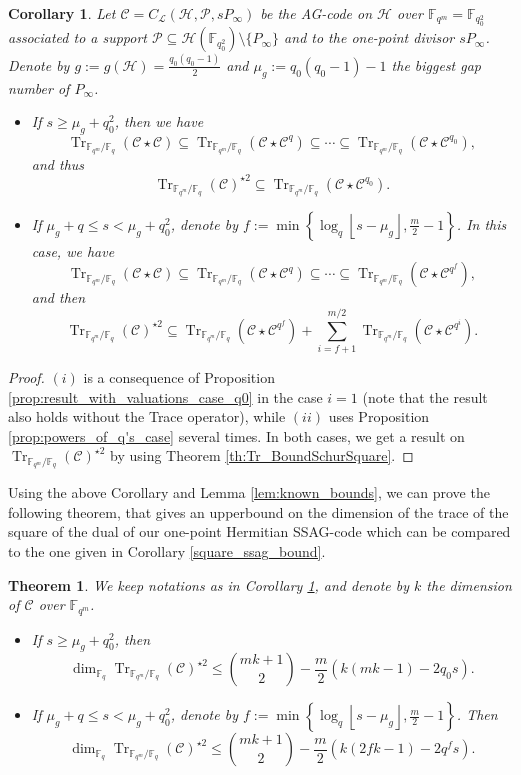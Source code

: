 \documentclass[a4paper]{article}
\newtheorem{coro1}{Corollary}
\newtheorem{thm}{Theorem}
\newcommand{\calP}{\mathcal{P}}
\newcommand{\calH}{\mathcal{H}}
\newcommand{\calL}{\mathcal{L}}
\newcommand{\calC}{\mathcal{C}}
\newcommand{\fqm}{\mathbb{F}_{q^m}}
\newcommand{\fq}{\mathbb{F}_{q}}
\newcommand{\F}{\mathbb{F}}
\newcommand{\Tr}[1]{\operatorname{Tr}_{\mathbb{F}_{q^m}/\fq}\left(#1\right)}
\newcommand{\Floor}[1]{\left\lfloor #1 \right\rfloor}
\begin{document}
\begin{coro1} \label{coro:_inclusion_code_SSAG_case}
Let $\calC = C_{\calL}(\calH,\calP,sP_{\infty})$ be the AG-code on $\calH$ over $\mathbb{F}_{q^m}=\mathbb{F}_{q_0^2}$ associated to a support $\calP \subseteq\calH(\F_{q_0^2})\setminus \{P_{\infty}\}$ and to the one-point divisor $sP_{\infty}$. Denote by $g:=g(\calH)=\frac{q_0(q_0-1)}{2}$ and $\mu_g := q_0(q_0-1)-1$ the biggest gap number of $P_{\infty}$. 
\begin{itemize}
    \item[(i)] If $s \geq \mu_g + q_0^2$, then we have 
        \[\Tr{\calC \star \calC} \subseteq \Tr{\calC \star \calC^q} \subseteq \cdots \subseteq \Tr{\calC \star \calC^{q_0}},\]
        and thus 
        \[\Tr{\calC}^{\star 2} \subseteq \Tr{\calC \star \calC^{q_0}}.\]
    \item[(ii)] {\color{brown}If $\mu_g +q \leq s < \mu_g +q_0^2$, denote by $f:=\min\left\{\log_q\Floor{s-\mu_g},\frac{m}{2}-1\right\}$.} In this case, we have 
        \[\Tr{\calC \star \calC} \subseteq \Tr{\calC \star \calC^q} \subseteq \cdots \subseteq \Tr{\calC \star \calC^{q^f}},\]
          and then
        \[\Tr{\calC}^{\star 2} \subseteq \Tr{\calC \star \calC^{q^f}} + \sum\limits_{i=f+1}^{m/2} \Tr{\calC \star \calC^{q^i}}.\]
\end{itemize}
\end{coro1}

\begin{proof}
$(i)$ is a consequence of Proposition \ref{prop:result_with_valuations_case_q0} in the case $i=1$ (note that the result also holds without the Trace operator), while $(ii)$ uses Proposition \ref{prop:powers_of_q's_case} several times. In both cases, we get a result on $\Tr{\calC}^{\star 2}$ by using Theorem \ref{th:Tr_BoundSchurSquare}.
\end{proof}

Using the above Corollary and Lemma \ref{lem:known_bounds}, we can prove the following theorem, that gives an upperbound on the dimension of the trace of the square of the dual of our one-point Hermitian SSAG-code which can be compared to the one given in Corollary \ref{square_ssag_bound}.

\begin{thm} \label{th:our_sup_bounds_on_codes}
We keep notations as in Corollary \ref{coro:_inclusion_code_SSAG_case}, and denote by $k$ the dimension of $\calC$ over $\fqm$.
\begin{itemize}
\item[(i)] If $s \geq \mu_g + q_0^2$, then 
\[   \dim_{\fq} \Tr{\calC}^{\star 2}  \leq \binom{mk+1}{2} - \dfrac{m}{2} (k(mk-1)-2q_0s).\]
\item[(ii)] {\color{brown}If $\mu_g +q \leq s < \mu_g +q_0^2$, denote by $f:=\min\left\{\log_q\Floor{s-\mu_g},\frac{m}{2}-1\right\}$.} Then 
\[   \dim_{\fq} \Tr{\calC}^{\star 2}  \leq \binom{mk+1}{2} - \dfrac{m}{2}(k(2fk-1)-2q^fs).\]
\end{itemize}
\end{thm}
\end{document}
